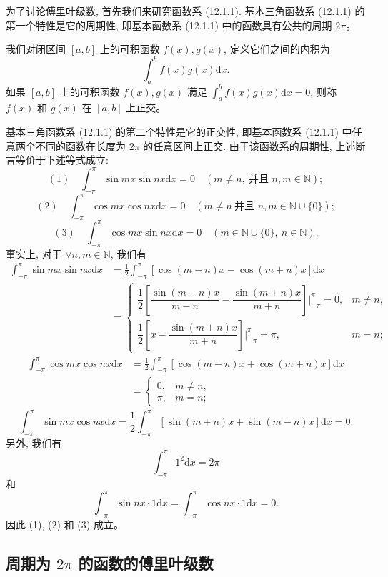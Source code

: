 \documentclass[UTF8, 12pt, fontset=fandol, oneside]{ctexart}
\begin{document}
为了讨论傅里叶级数, 首先我们来研究函数系 (12.1.1). 基本三角函数系 (12.1.1) 的第一个特性是它的周期性, 即基本函数系 (12.1.1) 中的函数具有公共的周期 $2\pi$。

我们对闭区间 $[a,b]$ 上的可积函数 $f(x),g(x)$, 定义它们之间的内积为
\[
  \int_a^b f(x)g(x)\mathrm dx.
\]
如果 $[a,b]$ 上的可积函数 $f(x),g(x)$ 满足 $\int_a^b f(x)g(x)\mathrm dx=0$, 则称 $f(x)$ 和 $g(x)$ 在 $[a,b]$ 上正交。

基本三角函数系 (12.1.1) 的第二个特性是它的正交性, 即基本函数系 (12.1.1) 中任意两个不同的函数在长度为 $2\pi$ 的任意区间上正交. 由于该函数系的周期性, 上述断言等价于下述等式成立:
\[
  (1)\quad \int_{-\pi}^{\pi}\sin mx\sin nx\mathrm dx=0
  \quad (m\ne n,\ \text{并且 }n,m\in\mathbb N);
\]
\[
  (2)\quad \int_{-\pi}^{\pi}\cos mx\cos nx\mathrm dx=0
  \quad (m\ne n\ \text{并且 }n,m\in\mathbb N\cup\{0\});
\]
\[
  (3)\quad \int_{-\pi}^{\pi}\cos mx\sin nx\mathrm dx=0
  \quad (m\in\mathbb N\cup\{0\},\ n\in\mathbb N).
\]
事实上, 对于 $\forall n,m\in\mathbb N$, 我们有
\[
\begin{aligned}
  \int_{-\pi}^{\pi}\sin mx\sin nx\mathrm dx
  &=\frac12\int_{-\pi}^{\pi}[\cos(m-n)x-\cos(m+n)x]\mathrm dx \\
  &=
  \begin{cases}
    \dfrac12\left[\dfrac{\sin(m-n)x}{m-n}-\dfrac{\sin(m+n)x}{m+n}\right]\bigg|_{-\pi}^{\pi}=0,
      & m\ne n,\\[1.2em]
    \dfrac12\left[x-\dfrac{\sin(m+n)x}{m+n}\right]\bigg|_{-\pi}^{\pi}=\pi,
      & m=n;
  \end{cases}
\end{aligned}
\]
\[
\begin{aligned}
  \int_{-\pi}^{\pi}\cos mx\cos nx\mathrm dx
  &=\frac12\int_{-\pi}^{\pi}[\cos(m-n)x+\cos(m+n)x]\mathrm dx \\
  &=
  \begin{cases}
    0, & m\ne n,\\
    \pi, & m=n;
  \end{cases}
\end{aligned}
\]
\[
  \int_{-\pi}^{\pi}\sin mx\cos nx\mathrm dx
  =\frac12\int_{-\pi}^{\pi}[\sin(m+n)x+\sin(m-n)x]\mathrm dx=0.
\]
另外, 我们有
\[
  \int_{-\pi}^{\pi}1^2\mathrm dx=2\pi
\]
和
\[
  \int_{-\pi}^{\pi}\sin nx\cdot1\mathrm dx
  =\int_{-\pi}^{\pi}\cos nx\cdot1\mathrm dx=0.
\]
因此 (1), (2) 和 (3) 成立。

\subsection{周期为 $2\pi$ 的函数的傅里叶级数}
\end{document}
